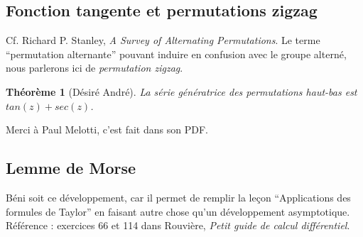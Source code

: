 \documentclass[a4paper, 11pt]{article}
\def\R{\mathbb{R}}
\def\M{\mathcal{M}}
\def\Tr{\textnormal{Tr}}
\newtheorem*{theorem}{Théorème}
\begin{document}




\newpage



\subsection{Fonction tangente et permutations zigzag}

Cf. Richard P. Stanley, \emph{A Survey of Alternating Permutations}. Le terme
\enquote{permutation alternante} pouvant induire en confusion avec le groupe
alterné, nous parlerons ici de \emph{permutation zigzag}.

\begin{theorem}[Désiré André]
La série génératrice des permutations haut-bas est $tan(z)+sec(z)$.
\end{theorem}

Merci à Paul Melotti, c'est fait dans son PDF.

\newpage

\subsection{Lemme de Morse}

Béni soit ce développement, car il permet de remplir la leçon
\enquote{Applications des formules de Taylor} en faisant autre chose qu'un
développement asymptotique. Référence : exercices 66 et 114 dans Rouvière,
\emph{Petit guide de calcul différentiel}.
\end{document}
